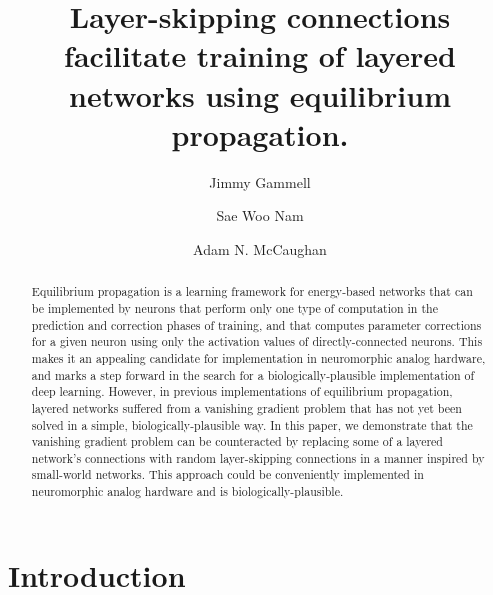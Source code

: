\documentclass[format=sigconf]{acmart}
\title{Layer-skipping connections facilitate training of layered networks using equilibrium propagation.}
\author{Jimmy Gammell}
\author{Sae Woo Nam}
\author{Adam N. McCaughan}
\begin{document}
\begin{abstract}

Equilibrium propagation is a learning framework for energy-based networks that can be implemented by neurons that perform only one type of computation in the prediction and correction phases of training, and that computes parameter corrections for a given neuron using only the activation values of directly-connected neurons. This makes it an appealing candidate for implementation in neuromorphic analog hardware, and marks a step forward in the search for a biologically-plausible implementation of deep learning. However, in previous implementations of equilibrium propagation, layered networks suffered from a vanishing gradient problem that has not yet been solved in a simple, biologically-plausible way. In this paper, we demonstrate that the vanishing gradient problem can be counteracted by replacing some of a layered network's connections with random layer-skipping connections in a manner inspired by small-world networks. This approach could be conveniently implemented in neuromorphic analog hardware and is biologically-plausible.

\end{abstract}

\maketitle

\section{Introduction}
\end{document}

